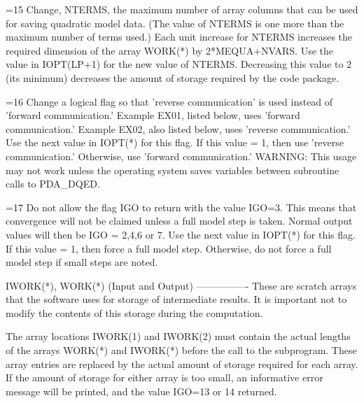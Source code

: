 \documentclass[11pt,twoside,nolof]{starlink}
\begin{document}
\begin{terminalv}
     =15          Change, NTERMS,  the maximum number of array
                  columns that can be used for saving quadratic
                  model data.  (The value of NTERMS is one more
                  than the maximum number of terms used.)  Each
                  unit increase for NTERMS increases the required
                  dimension of the array WORK(*) by 2*MEQUA+NVARS.
                  Use the value in IOPT(LP+1) for the new value
                  of NTERMS.  Decreasing this value to 2 (its
                  minimum) decreases the amount of storage
                  required by the code package.

     =16          Change a logical flag so that 'reverse
                  communication' is used instead of 'forward
                  communication.'  Example EX01, listed below,
                  uses 'forward communication.'  Example EX02,
                  also listed below, uses 'reverse communication.'
                  Use the next value in IOPT(*) for
                  this flag.  If this value = 1, then
                  use 'reverse communication.'  Otherwise,
                  use 'forward communication.'  WARNING:  This
                  usage may not work unless the operating system
                  saves variables between subroutine calls to PDA_DQED.

     =17          Do not allow the flag IGO to return with the
                  value IGO=3.  This means that convergence will
                  not be claimed unless a full model step is taken.
                  Normal output values will then be IGO = 2,4,6 or 7.
                  Use the next value in IOPT(*) for this flag.  If
                  this value = 1, then force a full model step.
                  Otherwise,  do not force a full model step if small
                  steps are noted.

  IWORK(*), WORK(*) (Input and Output)
  ----------------
  These  are  scratch arrays that the software uses for storage of
  intermediate  results.   It  is  important  not  to  modify  the
  contents of this storage during the computation.

  The  array  locations  IWORK(1)  and  IWORK(2)  must contain the
  actual  lengths  of  the  arrays WORK(*) and IWORK(*) before the
  call to the subprogram.  These array entries are replaced by the
  actual amount of storage required for each array.  If the amount
  of  storage  for either array is too small, an informative error
  message will be printed, and the value IGO=13 or 14 returned.


\end{terminalv}
\end{document}
